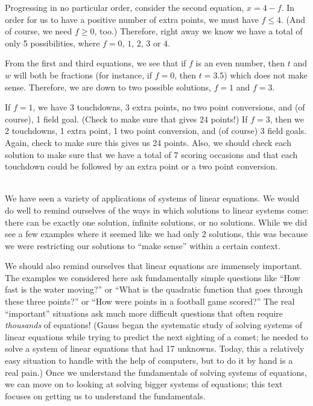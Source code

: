 {Progressing in no particular order, consider the second equation, $x = 4-f$. In order for us to have a positive number of extra points, we must have $f\leq 4$. (And of course, we need $f\geq 0$, too.) Therefore, right away we know we have a total of only 5 possibilities, where $f = 0$, $1$, $2$, $3$ or $4$.

From the first and third equations, we see that if $f$ is an even number, then $t$ and $w$ will both be fractions (for instance, if $f=0$, then $t = 3.5$) which does not make sense. Therefore, we are down to two possible solutions, $f = 1$ and $f=3$. 



If $f=1$, we have 3 touchdowns, 3 extra points, no two point conversions, and (of course), 1 field goal. (Check to make sure that gives 24 points!) If $f=3$, then we 2 touchdowns, 1 extra point, 1 two point conversion, and (of course) 3 field goals. Again, check to make sure this gives us 24 points. Also, we should check each solution to make sure that we have a total of 7 scoring occasions and that each touchdown could be followed by an extra point or a two point conversion.}\\ %

We have seen a variety of applications of systems of linear equations. We would do well to remind ourselves of the ways in which solutions to linear systems come: there can be exactly one solution, infinite solutions, or no solutions. While we did see a few examples where it seemed like we had only 2 solutions, this was because we were restricting our solutions to ``make sense'' within a certain context. 

We should also remind ourselves that linear equations are immensely important. The examples we considered here ask fundamentally simple questions like ``How fast is the water moving?'' or ``What is the quadratic function that goes through these three points?'' or ``How were points in a football game scored?'' The real ``important'' situations ask much more difficult questions that often require \textit{thousands} of equations! (Gauss began the systematic study of solving systems of linear equations while trying to predict the next sighting of a comet; he needed to solve a system of linear equations that had 17 unknowns. Today, this a relatively easy situation to handle with the help of computers, but to do it by hand is a real pain.) Once we understand the fundamentals of solving systems of equations, we can move on to looking at solving bigger systems of equations; this text focuses on getting us to understand the fundamentals.\\




